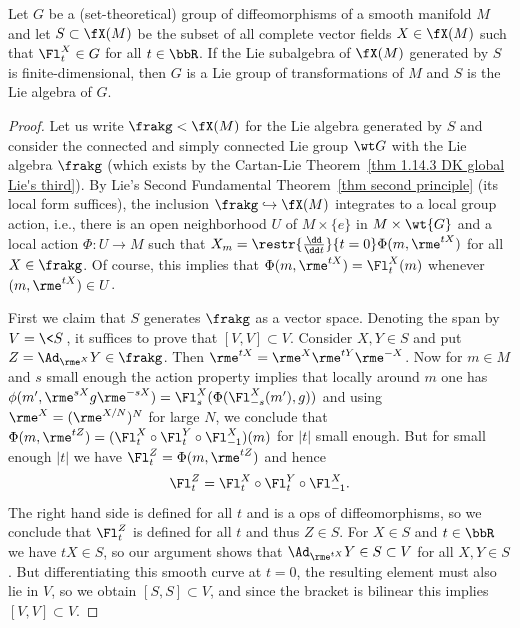 \begin{cor}\label{prop 1.5.11 Cap}
    Let $G$ be a (set-theoretical) group of diffeomorphisms of a smooth manifold $M$ and let $S\subset \fX(M)$ be the subset of all complete vector fields $X\in\fX(M)$ such that $\Fl^X_t\in G$ for all $t\in \bbR$. If the Lie subalgebra of $\fX(M)$ generated by $S$ is finite-dimensional, then $G$ is a Lie group of transformations of $M$ and $S$ is the Lie algebra of $G$.
\end{cor}
\begin{proof}
    Let us write $\frakg<\fX(M)$ for the Lie algebra generated by $S$ and consider the connected and simply connected Lie group $\wt G$ with the Lie algebra $\frakg$ (which exists by the Cartan-Lie Theorem~\ref{thm 1.14.3 DK global Lie's third}). By Lie's Second Fundamental Theorem~\ref{thm second principle} (its local form suffices), the inclusion $\frakg\hookrightarrow\fX(M)$ integrates to a local group action, i.e., there is an open neighborhood $U$ of $M\times\{e\}$ in $M\times\wt{G}$ and a local action $\Phi:U\to M$ such that $X_m=\restr{\frac{\dd}{\dd t}}{t=0}\Phi(m,\rme^{tX})$ for all $X\in\frakg$. Of course, this implies that $\Phi(m,\rme^{tX})=\Fl_t^X(m)$ whenever $(m,\rme^{tX})\in U$.

    First we claim that $S$ generates $\frakg$ as a vector space. Denoting the span by $V=\<S\>$, it suffices to prove that $[V,V]\subset V$. Consider $X,Y\in S$ and put $Z=\Ad_{\rme^{X}}Y\in\frakg$. Then $\rme^{tX}=\rme^X\rme^{tY}\rme^{-X}$. Now for $m\in M$ and $s$ small enough the action property implies that locally around $m$ one has $\phi(m',\rme^{sX}g\rme^{-sX})=\Fl_s^X(\Phi(\Fl_{-s}^X(m'),g))$ and using $\rme^X=(\rme^{X/N})^N$  for large $N$, we conclude that $\Phi(m,\rme^{tZ})=(\Fl_t^X\circ\Fl_t^Y\circ \Fl_{-1}^X)(m)$ for $|t|$ small enough. But for small enough $|t|$ we have $\Fl_t^Z=\Phi(m,\rme^{tZ})$ and hence 
    \[\Fl_t^Z=\Fl_t^X\circ \Fl_t^Y\circ \Fl_{-1}^X.\]
    The right hand side is defined for all $t$ and is a \gls{ops} of diffeomorphisms, so we conclude that $\Fl_t^Z$ is defined for all $t$ and thus $Z\in S$. For $X\in S$ and $t\in\bbR$ we have $tX\in S$, so our argument shows that $\Ad_{\rme^{tX}}Y\in S\subset V$ for all $X,Y\in S$. But differentiating this smooth curve at $t=0$, the resulting element must also lie in $V$, so we obtain $[S,S]\subset V$, and since the bracket is bilinear this implies $[V,V]\subset V$.


\end{proof}
